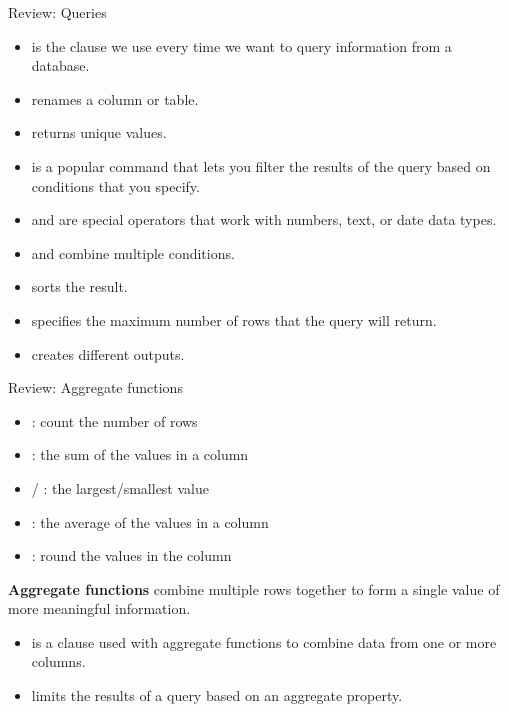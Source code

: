 \documentclass{beamer}
\begin{document}
\begin{frame}{Review: Queries}
\begin{itemize}
  \item {} is the clause we use every time we want to query information from a database.
  \item {} renames a column or table.
  \item {} returns unique values.
  \item {} is a popular command that lets you filter the results of the query
        based on conditions that you specify.
  \item {} and  are special operators that work with numbers,
        text, or date data types.
  \item {} and  combine multiple conditions.
  \item {} sorts the result.
  \item {} specifies the maximum number of rows that the query will return.
  \item {} creates different outputs.
\end{itemize}
\end{frame}

\begin{frame}{Review: Aggregate functions}
\begin{itemize}
  \item {}: count the number of rows
  \item {}: the sum of the values in a column
  \item {} / : the largest/smallest value
  \item {}: the average of the values in a column
  \item {}: round the values in the column
\end{itemize}
\vspace{0.5em}
\textbf{Aggregate functions} combine multiple rows together to form a single value of
more meaningful information.
\begin{itemize}
  \item {} is a clause used with aggregate functions to combine data from
        one or more columns.
  \item {} limits the results of a query based on an aggregate property.
\end{itemize}
\end{frame}
\end{document}

